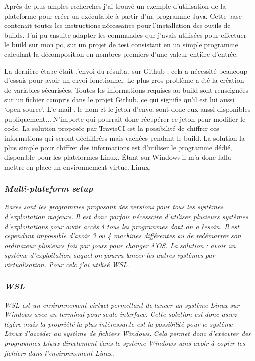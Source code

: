 \documentclass[french,a4paper,12pt]{report}
\begin{document}
Après de plus amples recherches j’ai trouvé un exemple d’utilisation de la plateforme pour créer un exécutable à partir d’un programme Java. Cette base contenait toutes les instructions nécessaires pour l’installation des outils de builds. J’ai pu ensuite adapter les commandes que j’avais utilisées pour effectuer le build sur mon pc, sur un projet de test consistant en un simple programme calculant la décomposition en nombres premiers d'une valeur entière d'entrée.

La dernière étape était l’envoi du résultat sur Github ; cela a nécessité beaucoup d'essais pour avoir un envoi fonctionnel. Le plus gros problème a été la création de variables sécurisées. Toutes les informations requises au build sont renseignées sur un fichier compris dans le projet Github, ce qui signifie qu’il est lui aussi ‘open source’. L’e-mail , le nom et le jeton d’envoi sont donc eux aussi disponibles publiquement... N’importe qui pourrait donc récupérer ce jeton pour modifier le code. La solution proposée par TravisCI est la possibilité de chiffrer ces informations qui seront déchiffrées mais cachées pendant le build. La solution la plus simple pour chiffrer des informations est d’utiliser le programme dédié, disponible pour les plateformes Linux. Étant sur Windows il m’a donc fallu mettre en place un environnement virtuel Linux.

\subsubsection{\textit{Multi-plateform setup}}

\textit{Rares sont les programmes proposant des versions pour tous les systèmes d’exploitation majeurs. Il est donc parfois nécessaire d’utiliser plusieurs systèmes d’exploitations pour avoir accès à tous les programmes dont on a besoin. Il est cependant impossible d’avoir 3 ou 4 machines différentes ou de redémarrer son ordinateur plusieurs fois par jours pour changer d’OS. La solution : avoir un système d’exploitation duquel on pourra lancer les autres systèmes par virtualisation. Pour cela j’ai utilisé WSL.}

\subsubsection{\textit{WSL}}

\textit{WSL est un environnement virtuel permettant de lancer un système Linux sur Windows avec un terminal pour seule interface. Cette solution est donc assez légère mais la propriété la plus intéressante est la possibilité pour le système Linux d’accéder au système de fichiers Windows. Cela permet donc d’exécuter des programmes Linux directement dans le système Windows sans avoir à copier les fichiers dans l’environnement Linux.}\\
\end{document}
